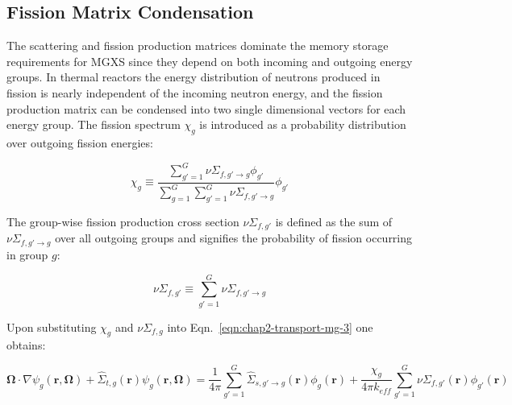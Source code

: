 \subsection{Fission Matrix Condensation}
\label{sec:chap2-fiss-mat}

The scattering and fission production matrices dominate the memory storage requirements for \ac{MGXS} since they depend on both incoming and outgoing energy groups. In thermal reactors the energy distribution of neutrons produced in fission is nearly independent of the incoming neutron energy, and the fission production matrix can be condensed into two single dimensional vectors for each energy group. The fission spectrum $\chi_{g}$ is introduced as a probability distribution over outgoing fission energies:

\begin{dmath}
\label{eqn:chap2-chi}
\chi_{g} \equiv \frac{\displaystyle\sum\limits_{g'=1}^{G}\nu\Sigma_{f,g'\rightarrow g}\phi_{g'}}{\displaystyle\sum\limits_{g=1}^{G}\displaystyle\sum\limits_{g'=1}^{G}\nu\Sigma_{f,g'\rightarrow g}}\phi_{g'}
\end{dmath}

The group-wise fission production cross section $\nu\Sigma_{f,g'}$ is defined as the sum of $\nu\Sigma_{f,g'\rightarrow g}$ over all outgoing groups and signifies the probability of fission occurring in group $g$:

\begin{dmath}
\label{eqn:chap2-nusifg}
\nu\Sigma_{f,g'} \equiv \displaystyle\sum\limits_{g'=1}^{G}\nu\Sigma_{f,g'\rightarrow g}
\end{dmath}

\noindent Upon substituting $\chi_{g}$ and $\nu\Sigma_{f,g}$ into Eqn.~\ref{eqn:chap2-transport-mg-3} one obtains:

\begin{dmath}
\label{eqn:chap2-transport-mg-4}
\mathbf{\Omega} \cdot \nabla \psi_{g}(\mathbf{r},\mathbf{\Omega}) + \hat{\Sigma}_{t,g}(\mathbf{r})\psi_{g}(\mathbf{r},\mathbf{\Omega}) = \frac{1}{4\pi} \sum_{g'=1}^{G} \hat{\Sigma}_{s,g' \rightarrow g}(\mathbf{r}) \phi_{g}(\mathbf{r}) + \frac{\chi_{g}}{4\pi k_{eff}}\sum_{g'=1}^{G} \nu\Sigma_{f,g'}(\mathbf{r})\phi_{g'}(\mathbf{r})
\end{dmath}


